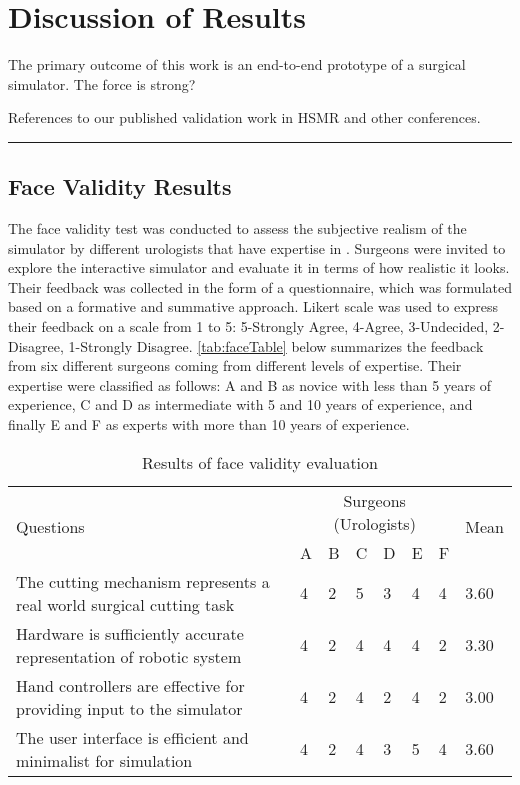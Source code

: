 
\chapter{Discussion of Results}\label{chp:discussion}

The primary outcome of this work is an end-to-end prototype of a surgical simulator. The force is strong?

References to our published validation work in HSMR and other conferences.

\hrule%

\section{Face Validity Results}\label{sec:face}
The face validity test was conducted to assess the subjective realism of the simulator by different urologists that have expertise in . Surgeons were invited to explore the interactive simulator and evaluate it in terms of how realistic it looks. Their feedback was collected in the form of a questionnaire, which was formulated based on a formative and summative approach. Likert scale was used to express their feedback on a scale from 1 to 5: 5-Strongly Agree, 4-Agree, 3-Undecided, 2-Disagree, 1-Strongly Disagree.
\autoref{tab:faceTable} below summarizes the feedback from six different surgeons coming from different levels of expertise. Their expertise were classified as follows: A and B as novice with less than 5 years of experience, C and D as intermediate with 5 and 10 years of experience, and finally E and F as experts with more than 10 years of experience.

\begin{table}
\small
\centering
\begin{tabular}{p{6cm}p{0.5cm}p{0.5cm}p{0.5cm}p{0.5cm}p{0.5cm}p{0.5cm}p{0.8cm}}
 \multirow{2}{4em}{Questions} & \multicolumn{6}{c}{Surgeons (Urologists)} & \multirow{2}{4em}{Mean}\\
  \cmidrule{2-7}
  & A & B & C & D & E & F &\\
  \toprule
  The cutting mechanism represents a real world surgical cutting task & 4& 2& 5& 3 & 4& 4 & 3.60\\
  \midrule
  Hardware is sufficiently accurate representation of robotic system
& 4& 2& 4 & 4 & 4 & 2 & 3.30\\
  \midrule
  Hand controllers are effective for providing input to the simulator
& 4 & 2 & 4& 2& 4 & 2 & 3.00\\
  \midrule
  The user interface is efficient and minimalist for simulation  & 4 & 2& 4 & 3 & 5& 4 & 3.60\\
  \bottomrule
\end{tabular}
\caption{Results of face validity evaluation}\label{tab:faceTable}
\end{table}

